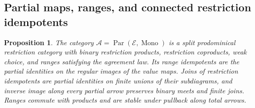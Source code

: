 \documentclass[11pt]{article}
\newtheorem{proposition}[theorem]{Proposition}
\begin{document}
\subsection{Partial maps, ranges, and connected restriction idempotents}

\begin{proposition}\label{prop:fork-structure}
The category $\mathcal A=\operatorname{Par}(\mathcal E,
\operatorname{Mono})$ is a split prodominical restriction category
with binary restriction products, restriction coproducts, weak
choice, and ranges satisfying the agreement law. Its range idempotents
are the partial identities on the regular images of the value maps.
Joins of restriction idempotents are partial identities on finite
unions of their subdiagrams, and inverse image along every partial
arrow preserves binary meets and finite joins. Ranges commute with products and
are stable under pullback along total arrows.
\end{proposition}
\end{document}
